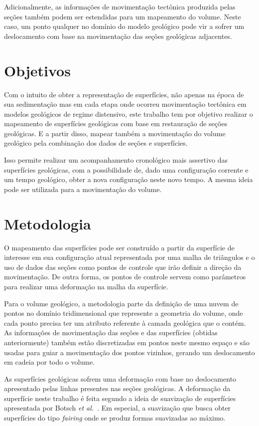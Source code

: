 Adicionalmente, as informações de movimentação tectônica produzida pelas seções também podem ser estendidas para um mapeamento do volume. Neste caso, um ponto qualquer no domínio do modelo geológico pode vir a sofrer um deslocamento com base na movimentação das seções geológicas adjacentes.

\section{Objetivos}

Com o intuito de obter a representação de superfícies, não apenas na época de sua sedimentação mas em cada etapa onde ocorreu movimentação tectônica em modelos geológicos de regime distensivo, este trabalho tem por objetivo realizar o mapeamento de superfícies geológicas com base em restauração de seções geológicas. E a partir disso, mapear também a movimentação do volume geológico pela combinação dos dados de seções e superfícies.

Isso permite realizar um acompanhamento cronológico mais assertivo das superfícies geológicas, com a possibilidade de, dado uma configuração corrente e um tempo geológico, obter a nova configuração neste novo tempo. A mesma ideia pode ser utilizada para a movimentação do volume.

\section{Metodologia}

O mapeamento das superfícies pode ser construído a partir da superfície de interesse em sua configuração atual representada por uma malha de triângulos e o uso de dados das seções como pontos de controle que irão definir a direção da movimentação. De outra forma, os pontos de controle servem como parâmetros para realizar uma deformação na malha da superfície.

Para o volume geológico, a metodologia parte da definição de uma nuvem de pontos no domínio tridimensional que represente a geometria do volume, onde cada ponto precisa ter um atributo referente à camada geológica que o contém. As informações de movimentação das seções e das superfícies (obtidas anteriormente) também estão discretizadas em pontos neste mesmo espaço e são usadas para guiar a movimentação dos pontos vizinhos, gerando um deslocamento em cadeia por todo o volume.

As superfícies geológicas sofrem uma deformação com base no deslocamento apresentado pelas linhas presentes nas seções geológicas. A deformação da superfície neste trabalho é feita segundo a ideia de suavização de superfícies apresentada por Botsch \emph{et al.}~\cite{Botsch}. Em especial, a suavização que busca obter superfícies do tipo \emph{fairing} onde se produz formas suavizadas ao máximo.

